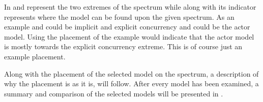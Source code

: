 In   and  represent the two extremes of the spectrum while  along with its indicator represents where the model  can be found upon the given spectrum. As an example  and  could be implicit and explicit concurrency and  could be the actor model. Using the placement of the example  would indicate that the actor model is mostly towards the explicit concurrency extreme. This is of course just an example placement.

Along with the placement of the selected model on the spectrum, a description of why the placement is as it is, will follow. After every model has been examined, a summary and comparison of the selected models will be presented in .
\worksheetend
